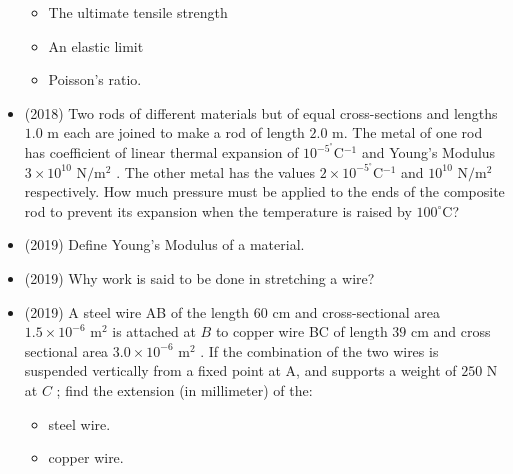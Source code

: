 \documentclass{article}
\begin{document}
\begin{itemize}
\begin{itemize}
\item The ultimate tensile strength 
\item An elastic limit 
\item Poisson’s ratio. 
\end{itemize}
\item (2018)  Two rods of different materials but of equal cross-sections and lengths $ 1.0$ m each are joined to make a rod of length $ 2.0$ m. The metal of one rod has coefficient of linear thermal expansion of $ 10^{-5}^{\circ}$C$ ^{-1}$ and Young’s Modulus $ 3 \times 10^{10}$ N$/$m$ ^{2}$ . The other metal has the values $ 2 \times 10^{-5}^{\circ}$C$ ^{-1}$ and $ 10^{10}$ N$/$m$ ^{2}$ respectively. How much pressure must be applied to the ends of the composite rod to prevent its expansion when the temperature is raised by $ 100^{\circ}$C? 
\item (2019)  Define Young’s Modulus of a material. 
\item (2019)  Why work is said to be done in stretching a wire? 
\item (2019)  A steel wire AB of the length $ 60$ cm and cross-sectional area $ 1.5 \times 10^{-6}$ m$ ^{2}$ is attached at $ B$ to copper wire BC of length $ 39$ cm and cross sectional area $ 3.0 \times 10^{-6}$ m$ ^{2}$ . If the combination of the two wires is suspended vertically from a fixed point at A, and supports a weight of $ 250$ N at $ C$ ; find the extension (in millimeter) of the:\begin{itemize}
\item steel wire. 
\item copper wire. 
\end{itemize}
\end{itemize}
\end{document}
